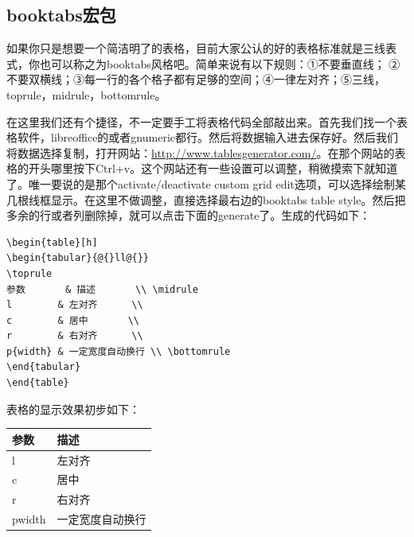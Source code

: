 \documentclass[12pt,oneside]{book}
\begin{document}
\begin{common-format}
\subsection{booktabs宏包}
如果你只是想要一个简洁明了的表格，目前大家公认的好的表格标准就是三线表式，你也可以称之为booktabs风格吧。简单来说有以下规则：①不要垂直线； ②不要双横线；③每一行的各个格子都有足够的空间；④一律左对齐；⑤三线，toprule，midrule，bottomrule。

在这里我们还有个捷径，不一定要手工将表格代码全部敲出来。首先我们找一个表格软件，libreoffice的或者gnumeric都行。然后将数据输入进去保存好。然后我们将数据选择复制，打开网站：\href{http://www.tablesgenerator.com/}{http://www.tablesgenerator.com/}。在那个网站的表格的开头哪里按下Ctrl+v。这个网站还有一些设置可以调整，稍微摸索下就知道了。唯一要说的是那个activate/deactivate custom grid edit选项，可以选择绘制某几根线框显示。在这里不做调整，直接选择最右边的booktabs table style。然后把多余的行或者列删除掉，就可以点击下面的generate了。生成的代码如下：
\begin{Verbatim}
\begin{table}[h]
\begin{tabular}{@{}ll@{}}
\toprule
参数       & 描述       \\ \midrule
l        & 左对齐      \\
c        & 居中       \\
r        & 右对齐      \\
p{width} & 一定宽度自动换行 \\ \bottomrule
\end{tabular}
\end{table}
\end{Verbatim}
表格的显示效果初步如下：
\begin{table}[H]
\begin{tabular}{@{}ll@{}}
\toprule
参数       & 描述       \\ \midrule
l        & 左对齐      \\
c        & 居中       \\
r        & 右对齐      \\
p{width} & 一定宽度自动换行 \\ \bottomrule
\end{tabular}
\end{table}


\end{common-format}
\end{document}
